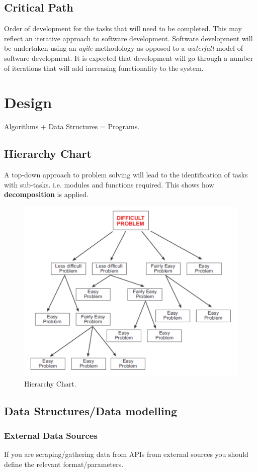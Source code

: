 \documentclass{article}
\begin{document}
\subsection{Critical Path}

Order of development for the tasks that will need to be completed. This may reflect an iterative approach to software development. Software development will be undertaken using an \textit{agile} methodology as opposed to a \textit{waterfall} model of software development. It is expected that development will go through a number of iterations that will add increasing functionality to the system.

\section{Design}
Algorithms + Data Structures = Programs.

\subsection{Hierarchy Chart}
A top-down approach to problem solving will lead to the identification of tasks with sub-tasks. i.e. modules and functions required. This shows how \textbf{decomposition} is applied.

\begin{figure}[!ht]
    \centering
    \includegraphics[width = 0.5\linewidth]{hierarchy_chart.png}
    \caption{Hierarchy Chart.}
    \label{fig:hierarchy}
\end{figure}

\subsection{Data Structures/Data modelling}
\subsubsection{External Data Sources}
If you are scraping/gathering data from APIs from external sources you should define the relevant format/parameters.
\end{document}
